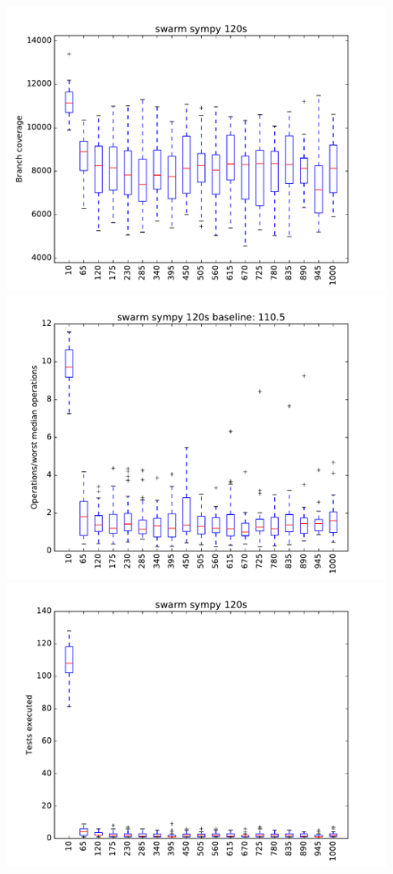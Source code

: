 \begin{figure}
\includegraphics[width=\columnwidth]{graphs/sympyswarm120}
\includegraphics[width=\columnwidth]{graphs/opssympyswarm120}
\includegraphics[width=\columnwidth]{graphs/execsympyswarm120}
\end{figure}
